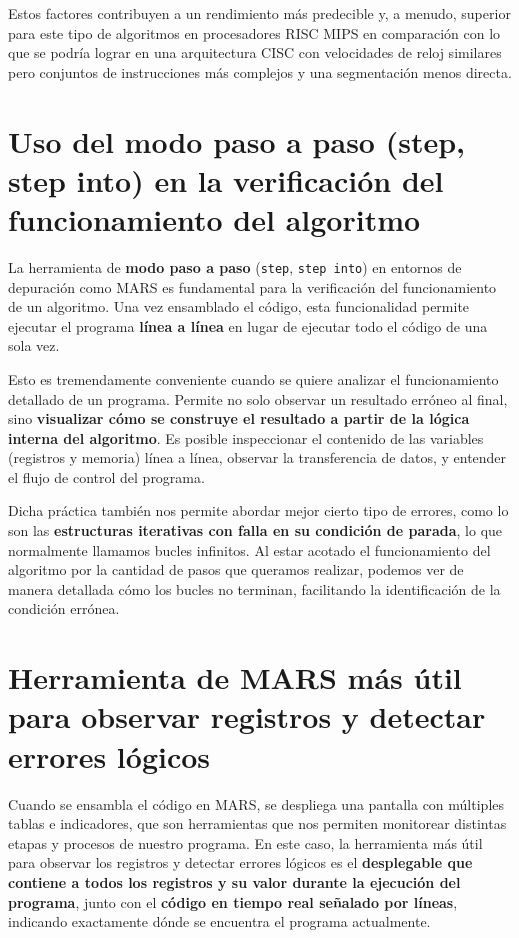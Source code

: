 \documentclass{article}
\begin{document}
Estos factores contribuyen a un rendimiento más predecible y, a menudo, superior para este tipo de algoritmos en procesadores RISC MIPS en comparación con lo que se podría lograr en una arquitectura CISC con velocidades de reloj similares pero conjuntos de instrucciones más complejos y una segmentación menos directa.

\section{Uso del modo paso a paso (step, step into) en la verificación del funcionamiento del algoritmo}
La herramienta de \textbf{modo paso a paso} (\texttt{step}, \texttt{step into}) en entornos de depuración como MARS es fundamental para la verificación del funcionamiento de un algoritmo. Una vez ensamblado el código, esta funcionalidad permite ejecutar el programa \textbf{línea a línea} en lugar de ejecutar todo el código de una sola vez.

Esto es tremendamente conveniente cuando se quiere analizar el funcionamiento detallado de un programa. Permite no solo observar un resultado erróneo al final, sino \textbf{visualizar cómo se construye el resultado a partir de la lógica interna del algoritmo}. Es posible inspeccionar el contenido de las variables (registros y memoria) línea a línea, observar la transferencia de datos, y entender el flujo de control del programa.

Dicha práctica también nos permite abordar mejor cierto tipo de errores, como lo son las \textbf{estructuras iterativas con falla en su condición de parada}, lo que normalmente llamamos bucles infinitos. Al estar acotado el funcionamiento del algoritmo por la cantidad de pasos que queramos realizar, podemos ver de manera detallada cómo los bucles no terminan, facilitando la identificación de la condición errónea.

\section{Herramienta de MARS más útil para observar registros y detectar errores lógicos}
Cuando se ensambla el código en MARS, se despliega una pantalla con múltiples tablas e indicadores, que son herramientas que nos permiten monitorear distintas etapas y procesos de nuestro programa. En este caso, la herramienta más útil para observar los registros y detectar errores lógicos es el \textbf{desplegable que contiene a todos los registros y su valor durante la ejecución del programa}, junto con el \textbf{código en tiempo real señalado por líneas}, indicando exactamente dónde se encuentra el programa actualmente.
\end{document}
